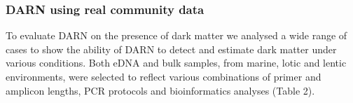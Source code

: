 \subsubsection*{DARN using real community data}

   To evaluate DARN on the presence of dark matter we analysed a wide range of cases to show the ability of DARN to detect and estimate dark matter under various conditions. 
   Both eDNA and bulk samples, from marine, lotic and lentic environments, were selected to reflect various combinations of primer and amplicon lengths, PCR protocols and bioinformatics analyses (Table 2).

   \begin{table}
      
      \begin{tabular}{@{}ccccccccccc@{}}
      

\end{tabular}
\end{table}
